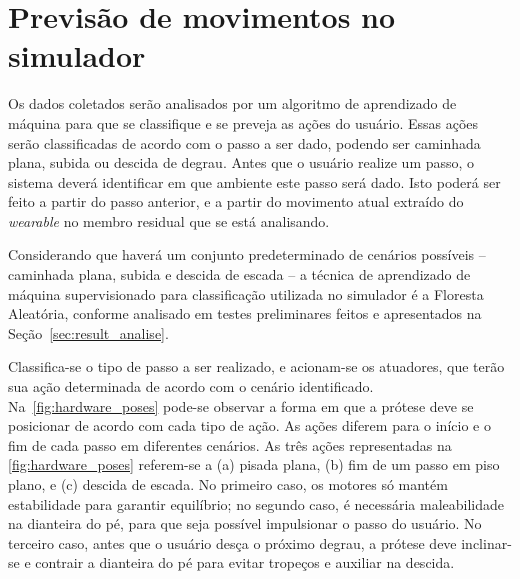 \section{Previsão de movimentos no simulador}\label{sec:metodo_previsao}

Os dados coletados serão analisados por um algoritmo de aprendizado de máquina para que se classifique e se preveja as ações do usuário. Essas ações serão classificadas de acordo com o passo a ser dado, podendo ser caminhada plana, subida ou descida de degrau.
% 
Antes que o usuário realize um passo, o sistema deverá identificar em que ambiente este passo será dado. Isto poderá ser feito a partir do passo anterior, 
e a partir do movimento atual extraído do \textit{wearable} no membro residual que se está analisando.

Considerando que haverá um conjunto predeterminado de cenários possíveis -- caminhada plana, subida e descida de escada -- 
a técnica de aprendizado de máquina supervisionado para classificação utilizada no simulador é a Floresta Aleatória, conforme analisado em testes preliminares feitos e apresentados na Seção~\ref{sec:result_analise}.

Classifica-se o tipo de passo a ser realizado, e acionam-se os atuadores, que terão sua ação determinada de acordo com o cenário identificado. Na~\autoref{fig:hardware_poses} pode-se observar a forma em que a prótese deve se posicionar de acordo com cada tipo de ação. As ações diferem para o início e o fim de cada passo em diferentes cenários.
% 
As três ações representadas na \autoref{fig:hardware_poses} referem-se a (a) pisada plana, (b) fim de um passo em piso plano, e (c) descida de escada. No primeiro caso, os motores só mantém estabilidade para garantir equilíbrio; no segundo caso, é necessária maleabilidade na dianteira do pé, para que seja possível impulsionar o passo do usuário. No terceiro caso, antes que o usuário desça o próximo degrau, a prótese deve inclinar-se e contrair a dianteira do pé para evitar tropeços e auxiliar na descida.

